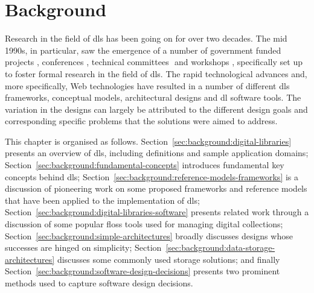 \chapter{Background\label{ch:background}}

Research in the field of \glspl{dl} has been going on for over two decades. The mid 1990s, in particular, saw the emergence of a number of government funded projects \citep{Griffin1998},   conferences \citep{Adam1995}, technical committees \citep{DCMI1999,Lorist2001}⁠ and workshops \citep{Dempsey1996,Lagoze1996}⁠, specifically set up to foster formal research in the field of \glspl{dl}. The rapid technological advances and, more specifically, Web technologies have resulted in a number of different \gls{dls} frameworks, conceptual models, architectural designs and \gls{dl} software tools. The variation in the designs can largely be attributed to the different design goals and corresponding specific problems that the solutions were aimed to address.

This chapter is organised as follows. Section~\ref{sec:background:digital-libraries} presents an overview of \glspl{dl}, including definitions and sample application domains; Section~\ref{sec:background:fundamental-concepts} introduces fundamental key concepts behind \glspl{dl}; Section~\ref{sec:background:reference-models-frameworks} is a discussion of pioneering work on some proposed frameworks and reference models that have been applied to the implementation of \gls{dls}; Section~\ref{sec:background:digital-libraries-software} presents related work through a discussion of some popular \gls{floss} tools used for managing digital collections; Section~\ref{sec:background:simple-architectures} broadly discusses designs whose successes are hinged on simplicity; Section~\ref{sec:background:data-storage-architectures} discusses some commonly used storage solutions; and finally Section~\ref{sec:background:software-design-decisions} presents two prominent methods used to capture software design decisions.








